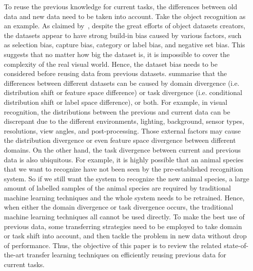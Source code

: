 \documentclass[prodmode]{acmsmall}  %
\begin{document}
To reuse the previous knowledge for current tasks, the differences between old data and new data need to be taken into account. Take the object recognition as an example. As claimed by~, despite the great efforts of object datasets creators, the datasets appear to have strong build-in bias caused by various factors, such as selection bias, capture bias, category or label bias, and negative set bias. This suggests that no matter how big the dataset is, it is impossible to cover the complexity of the real visual world. Hence, the dataset bias needs to be considered before reusing data from previous datasets.  summarise that the differences between different datasets can be caused by domain divergence (i.e. distribution shift or feature space difference) or task divergence (i.e. conditional distribution shift or label space difference), or both. 
For example, in visual recognition, the distributions between the previous and current data can be discrepant due to the different environments, lighting, background, sensor types, resolutions, view angles, and post-processing. Those external factors may cause the distribution divergence or even feature space divergence between different domains. On the other hand, the task divergence between current and previous data is also ubiquitous. For example, it is highly possible that an animal species that we want to recognize have not been seen by the pre-established recognition system. So if we still want the system to recognize the new animal species, a large amount of labelled samples of the animal species are required by traditional machine learning techniques and the whole system needs to be retrained. Hence, when either the domain divergence or task divergence occurs, the traditional machine learning techniques all cannot be used directly. To make the best use of previous data, some transferring strategies need to be employed to take domain or task shift into account, and then tackle the problem in new data without drop of performance. Thus, the objective of this paper is to review the related state-of-the-art transfer learning techniques on efficiently reusing previous data for current tasks.
\end{document}
